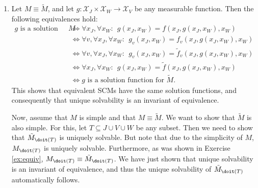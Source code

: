 \begin{enumerate}
\begin{ungradedsolution}
\begin{enumerate}
      Finally, for $v \in T$ and arbitrary $x \in X$, we obtain:
      \begin{align*}
        x_v = f'_v(x) & \Longleftrightarrow x_v = \xi_v            \\
                      & \Longleftrightarrow x_v = \tilde{f}'_v(x).
      \end{align*}
      Since $V \cup T = (V \setminus T) \cup T$, this proves the claim.
      \item Let $M \equiv \tilde{M}$, and let $g: \mathcal{X}_J \times \mathcal{X}_W \to \mathcal{X}_V$ be any measurable function.
      Then the following equivalences hold:
      \begin{align*}
        g \text{ is a solution function for } M & \Longleftrightarrow \forall x_J, \forall x_W: \ \ g(x_J, x_W) = f(x_J, g(x_J, x_W), x_W)                          \\
                                                & \Longleftrightarrow \forall v, \forall x_J, \forall x_W: \ \ g_v(x_J, x_W) = f_v(x_J, g(x_J, x_W), x_W)           \\
                                                & \Longleftrightarrow   \forall v, \forall x_J, \forall x_W: \ \ g_v(x_J, x_W) = \tilde{f}_v(x_J, g(x_J, x_W), x_W) \\
                                                & \Longleftrightarrow   \forall x_J, \forall x_W: \ \ g(x_J, x_W) = \tilde{f}(x_J, g(x_J, x_W), x_W)                \\
                                                & \Longleftrightarrow g \text{ is a solution function for } \tilde{M}.
      \end{align*}
      This shows that equivalent SCMs have the same solution functions, and consequently that unique solvability is an invariant of equivalence.

      Now, assume that $M$ is simple and that $M \equiv \tilde{M}$.
      We want to show that $\tilde{M}$ is also simple.
      For this, let $T \subseteq J \cup V \cup W$ be any subset.
      Then we need to show that $\tilde{M}_{\doit(T)}$ is uniquely solvable.
      But note that due to the simplicity of $M$, $M_{\doit(T)}$ is uniquely solvable.
      Furthermore, as was shown in Exercise \ref{ex:equiv}, $M_{\doit(T)} \equiv \tilde{M}_{\doit(T)}$. We have just shown that unique solvability is an invariant of equivalence, and thus the unique solvability of $\tilde{M}_{\doit(T)}$ automatically follows.


\end{enumerate}
\end{ungradedsolution}
\end{enumerate}
